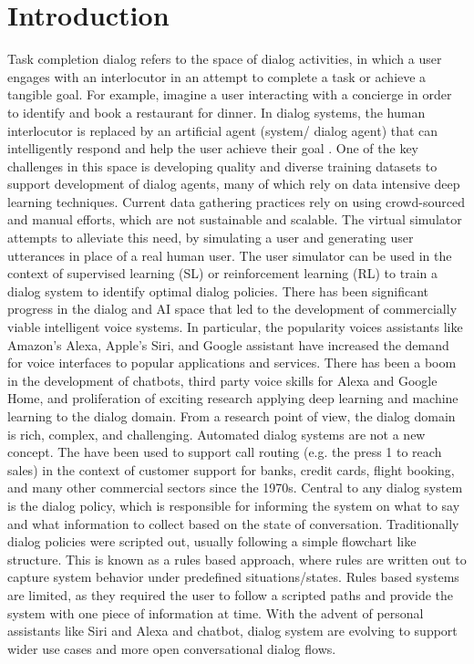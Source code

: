 

\chapter{Introduction}
\label{chap:intro}

Task completion dialog refers to the space of dialog activities, in which a user engages with an interlocutor in an attempt to complete a task or achieve a tangible goal. For example, imagine a user interacting with a concierge in order to identify and book a restaurant for dinner. In dialog systems, the human interlocutor is replaced by an artificial agent (system/ dialog agent) that can intelligently respond and help the user achieve their goal
. 
One of the key challenges in this space is developing quality and diverse training datasets to support development of dialog agents, many of which rely on data intensive deep learning techniques. Current data gathering practices rely on using crowd-sourced and manual efforts, which are not sustainable and scalable.  The virtual simulator attempts to alleviate this need, by simulating a user and generating user utterances in place of a real human user. The user simulator can be used in the context of supervised learning (SL) or reinforcement learning (RL) to train a dialog system to identify optimal dialog policies. 
There has been significant progress in the dialog and AI space that led to the development of commercially viable intelligent voice systems. In particular, the popularity voices assistants like Amazon’s Alexa, Apple’s Siri, and Google assistant have increased the demand for voice interfaces to popular applications and services. There has been a boom in the development of chatbots, third party voice skills for Alexa and Google Home, and proliferation of exciting research applying deep learning and machine learning to the dialog domain. From a research point of view, the dialog domain is rich, complex, and challenging.
Automated dialog systems are not a new concept. The have been used to support call routing (e.g. the press 1 to reach sales) in the context of customer support for banks, credit cards, flight booking, and many other commercial sectors since the 1970s. Central to any dialog system is the dialog policy, which is responsible for informing the system on what to say and what information to collect based on the state of conversation. Traditionally dialog policies were scripted out, usually following a simple flowchart like structure. This is known as a rules based approach, where rules are written out to capture system behavior under predefined situations/states. Rules based systems are limited, as they required the user to follow a scripted paths and provide the system with one piece of information at time. With the advent of personal assistants like Siri and Alexa and chatbot, dialog system are evolving to support wider use cases and more open conversational dialog flows. 

